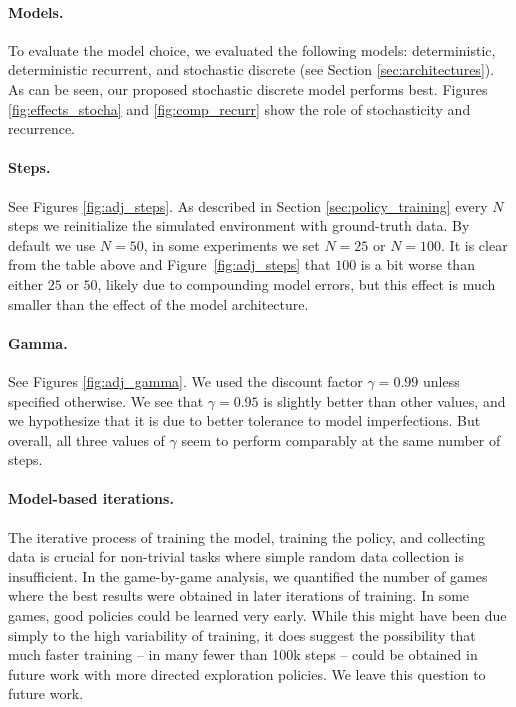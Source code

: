 \paragraph{Models.} To evaluate the model choice, we evaluated the following models: deterministic, deterministic recurrent, and stochastic discrete (see Section \ref{sec:architectures}). As can be seen, our proposed stochastic discrete model performs best. Figures \ref{fig:effects_stocha} and \ref{fig:comp_recurr} show the role of stochasticity and recurrence. 

\paragraph{Steps.} See Figures \ref{fig:adj_steps}. As described in Section \ref{sec:policy_training} every $N$ steps we reinitialize the simulated environment with ground-truth data. By default we use $N=50$, in some experiments 
we set $N=25$ or $N=100$. It is clear from the table above and Figure~\ref{fig:adj_steps} that $100$ is a bit worse than either $25$ or $50$, likely due to compounding model errors,
but this effect is much smaller than the effect of the model architecture.

\paragraph{Gamma.} See Figures \ref{fig:adj_gamma}. We used the discount factor $\gamma=0.99$ unless specified otherwise.  We see that $\gamma=0.95$ is slightly better than other values, and we hypothesize that it is due to better tolerance to model imperfections. But overall, all three values of $\gamma$ seem to perform comparably at the same number of steps.


\paragraph{Model-based iterations.}
The iterative process of training the model, training the policy, and collecting data is crucial for non-trivial tasks where simple random data collection is insufficient. In the game-by-game analysis, we quantified the number of games where the best results were obtained in later iterations of training. In some games, good policies could be learned very early. While this might have been due simply to the high variability of training, it does suggest the possibility that much faster training -- in many fewer than 100k steps -- could be obtained in future work with more directed exploration policies. We leave this question to future work.

